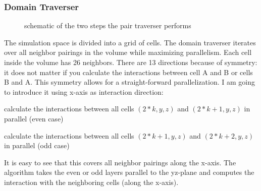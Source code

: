 \subsubsection{Domain Traverser}
\begin{figure}
  \centering
  \caption{schematic of the two steps the pair traverser performs}
\end{figure}
The simulation space is divided into a grid of cells. The domain traverser iterates over all neighbor pairings in the volume while maximizing parallelism. Each cell inside the volume has 26 neighbors. There are 13 directions because of symmetry: it does not matter if you calculate the interactions between cell A and B or cells B and A. This symmetry allows for a straight-forward parallelization.
I am going to introduce it using x-axis as interaction direction:
\begin{compactenum}
\item calculate the interactions between all cells $ \left ( 2*k, y, z \right ) $ and $ \left ( 2*k + 1, y, z \right ) $ in parallel (even case)
\item calculate the interactions between all cells $ \left ( 2*k + 1, y, z \right ) $ and $ \left ( 2*k + 2, y, z \right ) $ in parallel (odd case)
\end{compactenum}
It is easy to see that this covers all neighbor pairings along the x-axis.
The algorithm takes the even or odd layers parallel to the yz-plane and computes the interaction with the neighboring cells (along the x-axis).

